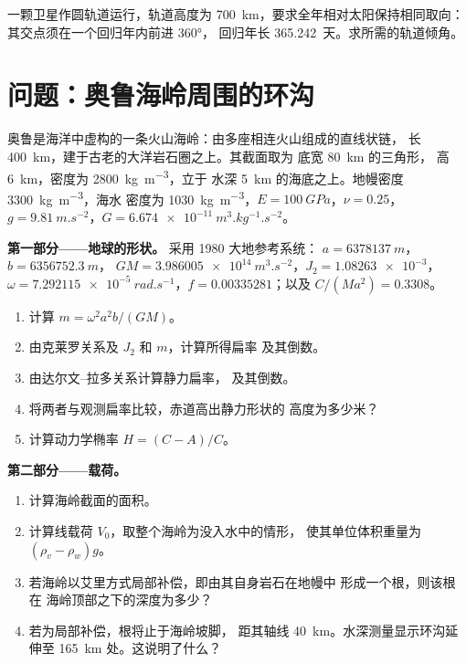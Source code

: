 \begin{exercise}[$\star\star\star$]\label{exo:b3:gravity-geodesy:12}
一颗卫星作圆轨道运行，轨道高度为 \qty{700}{km}，要求全年相对太阳保持相同取向：
其交点须在一个回归年内前进 \ang{360}，
回归年长 \num{365.242}~天。求所需的轨道倾角。
\end{exercise}

\section{问题：奥鲁海岭周围的环沟}

\begin{problem}
\label{pb:b3:gravity-geodesy:1}
奥鲁是海洋中虚构的一条火山海岭：由多座相连火山组成的直线状链，
长 \qty{400}{km}，建于古老的大洋岩石圈之上。其截面取为
底宽 \qty{80}{km} 的三角形，
高 \qty{6}{km}，密度为 \qty{2800}{kg.m^{-3}}，立于
水深 \qty{5}{km} 的海底之上。地幔密度 \qty{3300}{kg.m^{-3}}，海水
密度为 \qty{1030}{kg.m^{-3}}，$E = \qty{100}{GPa}$，$\nu = 0.25$，$g =
\qty{9.81}{m.s^{-2}}$，$G = \qty{6.674e-11}{m^3.kg^{-1}.s^{-2}}$。

\medskip
\noindent\textbf{第一部分——地球的形状。} 采用 1980 大地参考系统：
$a = \qty{6378137}{m}$，$b = \qty{6356752.3}{m}$，
$GM = \qty{3.986005e14}{m^3.s^{-2}}$，$J_2 = \num{1.08263e-3}$，
$\omega = \qty{7.292115e-5}{rad.s^{-1}}$，$f = \num{0.00335281}$；以及
$C/(Ma^2) = \num{0.3308}$。
\begin{enumerate}
  \item 计算 $m = \omega^2a^2b/(GM)$。
  \item 由克莱罗关系及 $J_2$ 和 $m$，计算所得扁率
        及其倒数。
  \item 由达尔文–拉多关系计算静力扁率，
        及其倒数。
  \item 将两者与观测扁率比较，赤道高出静力形状的
        高度为多少米？
  \item 计算动力学椭率 $H = (C - A)/C$。
\end{enumerate}

\noindent\textbf{第二部分——载荷。}
\begin{enumerate}[resume]
  \item 计算海岭截面的面积。
  \item 计算线载荷 $V_0$，取整个海岭为没入水中的情形，
        使其单位体积重量为 $(\rho_v - \rho_w)g$。
  \item 若海岭以艾里方式局部补偿，即由其自身岩石在地幔中
        形成一个根，则该根在
        海岭顶部之下的深度为多少？
  \item 若为局部补偿，根将止于海岭坡脚，
        距其轴线 \qty{40}{km}。水深测量显示环沟延伸至
        \qty{165}{km} 处。这说明了什么？
\end{enumerate}


\end{problem}
